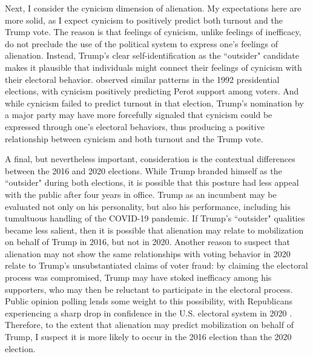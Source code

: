 \documentclass[12pt]{article}
\begin{document}
Next, I consider the cynicism dimension of alienation. My expectations here are more solid, as I expect cynicism to positively predict both turnout and the Trump vote. The reason is that feelings of cynicism, unlike feelings of inefficacy, do not preclude the use of the political system to express one's feelings of alienation. Instead, Trump's clear self-identification as the ``outsider" candidate makes it plausible that individuals might connect their feelings of cynicism with their electoral behavior. \textcite{southwell1998electoral} observed similar patterns in the 1992 presidential elections, with cynicism positively predicting Perot support among voters. And while cynicism failed to predict turnout in that election, Trump's nomination by a major party may have more forcefully signaled that cynicism could be expressed through one's electoral behaviors, thus producing a positive relationship between cynicism and both turnout and the Trump vote. 

A final, but nevertheless important, consideration is the contextual differences between the 2016 and 2020 elections. While Trump branded himself as the ``outsider" during both elections, it is possible that this posture had less appeal with the public after four years in office. Trump as an incumbent may be evaluated not only on his personality, but also his performance, including his tumultuous handling of the COVID-19 pandemic. If Trump's ``outsider" qualities became less salient, then it is possible that alienation may relate to mobilization on behalf of Trump in 2016, but not in 2020. Another reason to suspect that alienation may not show the same relationships with voting behavior in 2020 relate to Trump's unsubstantiated claims of voter fraud: by claiming the electoral process was compromised, Trump may have stoked inefficacy among his supporters, who may then be reluctant to participate in the electoral process. Public opinion polling lends some weight to this possibility, with Republicans experiencing a sharp drop in confidence in the U.S. electoral system in 2020 \parencite{mccarthy2022confidence}. Therefore, to the extent that alienation may predict mobilization on behalf of Trump, I suspect it is more likely to occur in the 2016 election than the 2020 election. 









\end{document}
